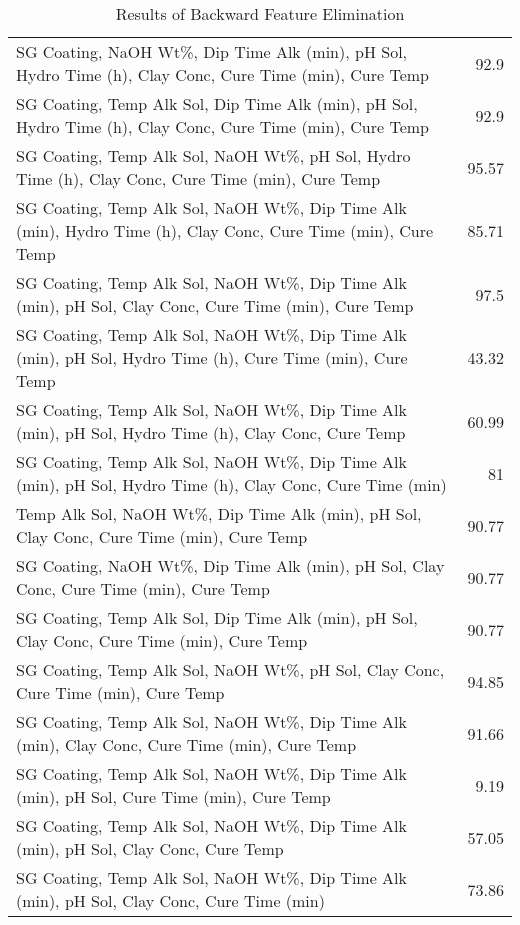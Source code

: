 \begin{table*}[h]
\begin{tabular}{lr}
 SG Coating, NaOH Wt\%, Dip Time Alk (min), pH Sol, Hydro Time (h), Clay Conc, Cure Time (min), Cure Temp                                 & 92.9  \\
 SG Coating, Temp Alk Sol, Dip Time Alk (min), pH Sol, Hydro Time (h), Clay Conc, Cure Time (min), Cure Temp                              & 92.9  \\
 SG Coating, Temp Alk Sol, NaOH Wt\%, pH Sol, Hydro Time (h), Clay Conc, Cure Time (min), Cure Temp                                       & 95.57 \\
 SG Coating, Temp Alk Sol, NaOH Wt\%, Dip Time Alk (min), Hydro Time (h), Clay Conc, Cure Time (min), Cure Temp                           & 85.71 \\
 SG Coating, Temp Alk Sol, NaOH Wt\%, Dip Time Alk (min), pH Sol, Clay Conc, Cure Time (min), Cure Temp                                   & 97.5  \\
 SG Coating, Temp Alk Sol, NaOH Wt\%, Dip Time Alk (min), pH Sol, Hydro Time (h), Cure Time (min), Cure Temp                              & 43.32 \\
 SG Coating, Temp Alk Sol, NaOH Wt\%, Dip Time Alk (min), pH Sol, Hydro Time (h), Clay Conc, Cure Temp                                    & 60.99 \\
 SG Coating, Temp Alk Sol, NaOH Wt\%, Dip Time Alk (min), pH Sol, Hydro Time (h), Clay Conc, Cure Time (min)                              & 81    \\
 Temp Alk Sol, NaOH Wt\%, Dip Time Alk (min), pH Sol, Clay Conc, Cure Time (min), Cure Temp                                               & 90.77 \\
 SG Coating, NaOH Wt\%, Dip Time Alk (min), pH Sol, Clay Conc, Cure Time (min), Cure Temp                                                 & 90.77 \\
 SG Coating, Temp Alk Sol, Dip Time Alk (min), pH Sol, Clay Conc, Cure Time (min), Cure Temp                                              & 90.77 \\
 SG Coating, Temp Alk Sol, NaOH Wt\%, pH Sol, Clay Conc, Cure Time (min), Cure Temp                                                       & 94.85 \\
 SG Coating, Temp Alk Sol, NaOH Wt\%, Dip Time Alk (min), Clay Conc, Cure Time (min), Cure Temp                                           & 91.66 \\
 SG Coating, Temp Alk Sol, NaOH Wt\%, Dip Time Alk (min), pH Sol, Cure Time (min), Cure Temp                                              &  9.19 \\
 SG Coating, Temp Alk Sol, NaOH Wt\%, Dip Time Alk (min), pH Sol, Clay Conc, Cure Temp                                                    & 57.05 \\
 SG Coating, Temp Alk Sol, NaOH Wt\%, Dip Time Alk (min), pH Sol, Clay Conc, Cure Time (min)                                              & 73.86 \\
\hline
\end{tabular}
        \caption{Results of Backward Feature Elimination}
        \label{backward}
    \end{table*}
    
